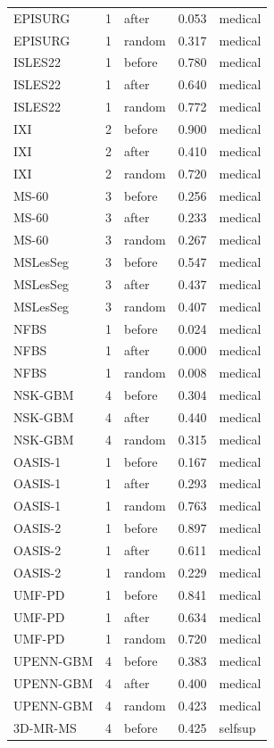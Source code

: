 \begin{tabular}{lrlrl}
EPISURG & 1 & after & 0.053 & medical \\
EPISURG & 1 & random & 0.317 & medical \\
ISLES22 & 1 & before & 0.780 & medical \\
ISLES22 & 1 & after & 0.640 & medical \\
ISLES22 & 1 & random & 0.772 & medical \\
IXI & 2 & before & 0.900 & medical \\
IXI & 2 & after & 0.410 & medical \\
IXI & 2 & random & 0.720 & medical \\
MS-60 & 3 & before & 0.256 & medical \\
MS-60 & 3 & after & 0.233 & medical \\
MS-60 & 3 & random & 0.267 & medical \\
MSLesSeg & 3 & before & 0.547 & medical \\
MSLesSeg & 3 & after & 0.437 & medical \\
MSLesSeg & 3 & random & 0.407 & medical \\
NFBS & 1 & before & 0.024 & medical \\
NFBS & 1 & after & 0.000 & medical \\
NFBS & 1 & random & 0.008 & medical \\
NSK-GBM & 4 & before & 0.304 & medical \\
NSK-GBM & 4 & after & 0.440 & medical \\
NSK-GBM & 4 & random & 0.315 & medical \\
OASIS-1 & 1 & before & 0.167 & medical \\
OASIS-1 & 1 & after & 0.293 & medical \\
OASIS-1 & 1 & random & 0.763 & medical \\
OASIS-2 & 1 & before & 0.897 & medical \\
OASIS-2 & 1 & after & 0.611 & medical \\
OASIS-2 & 1 & random & 0.229 & medical \\
UMF-PD & 1 & before & 0.841 & medical \\
UMF-PD & 1 & after & 0.634 & medical \\
UMF-PD & 1 & random & 0.720 & medical \\
UPENN-GBM & 4 & before & 0.383 & medical \\
UPENN-GBM & 4 & after & 0.400 & medical \\
UPENN-GBM & 4 & random & 0.423 & medical \\
3D-MR-MS & 4 & before & 0.425 & selfsup \\

\end{tabular}

